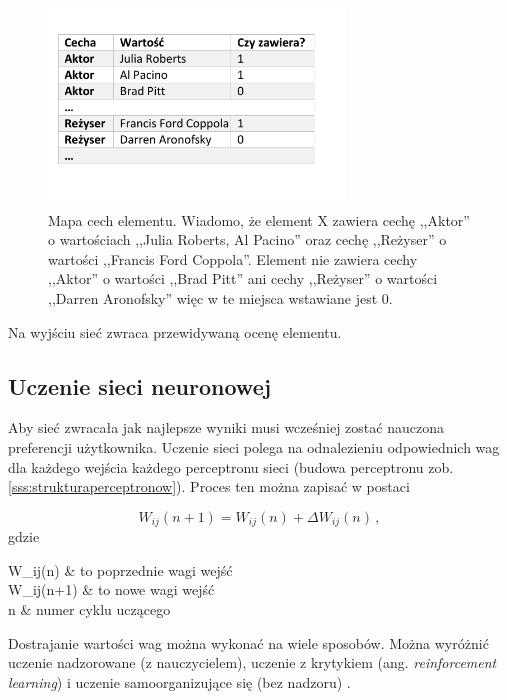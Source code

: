 \documentclass[twoside]{iisthesis}
\begin{document}
		 \begin{figure}%
		 	\centering
		 	\includegraphics[width=0.7\textwidth]{mapacech}
		 	\caption{Mapa cech elementu. Wiadomo, że element X zawiera cechę ,,Aktor'' o wartościach ,,Julia Roberts, Al Pacino'' oraz cechę ,,Reżyser'' o wartości ,,Francis Ford Coppola''. Element nie zawiera cechy ,,Aktor'' o wartości ,,Brad Pitt'' ani cechy ,,Reżyser'' o wartości ,,Darren Aronofsky'' więc w te miejsca wstawiane jest $0$.}
		 	\label{fig:mapacech}
		 \end{figure}
		 
		 Na wyjściu sieć zwraca przewidywaną ocenę elementu.
		 		 
		 
	 \subsection{Uczenie sieci neuronowej}
		 \label{ss:uczeniesiecineuronowej}
		 
		 Aby sieć zwracała jak najlepsze wyniki musi wcześniej zostać nauczona preferencji użytkownika. Uczenie sieci polega na odnalezieniu odpowiednich wag dla każdego wejścia każdego perceptronu sieci (budowa perceptronu zob. \ref{sss:strukturaperceptronow}). Proces ten można zapisać w postaci
		 
		 \begin{equation}
		 \label{eq:weightadaptation}
		 W_{ij}(n+1) = W_{ij}(n) + \Delta W_{ij}(n) 
		 \,,
		 \end{equation}		 		 
		 gdzie
		 
		 \begin{conditions*}
		 	W_{ij}(n) & to poprzednie wagi wejść \\
		 	W_{ij}(n+1) & to nowe wagi wejść \\
		 	n & numer cyklu uczącego 
		 \end{conditions*} 
		 
		 Dostrajanie wartości wag można wykonać na wiele sposobów. Można wyróżnić uczenie nadzorowane (z nauczycielem), uczenie z krytykiem (ang. \textit{reinforcement learning}) i uczenie samoorganizujące się (bez nadzoru) \cite{osowski1996sieci}.
		 
\end{document}
